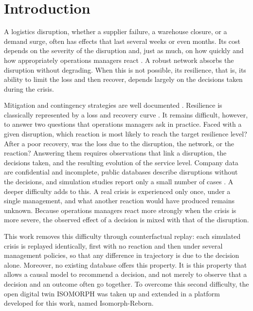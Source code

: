 \section{Introduction}
\label{sec:1}

A logistics disruption, whether a supplier failure, a warehouse closure, or a demand surge, often has effects that last several weeks or even months. Its cost depends on the severity of the disruption and, just as much, on how quickly and how appropriately operations managers react \citep{sheffi2005book,ivanov2019ijpr}. A robust network absorbs the disruption without degrading. When this is not possible, its resilience, that is, its ability to limit the loss and then recover, depends largely on the decisions taken during the crisis.

Mitigation and contingency strategies are well documented \citep{tomlin2006,chopra2004}. Resilience is classically represented by a loss and recovery curve \citep{bruneau2003,rahiel2026in4pl}. It remains difficult, however, to answer two questions that operations managers ask in practice. Faced with a given disruption, which reaction is most likely to reach the target resilience level? After a poor recovery, was the loss due to the disruption, the network, or the reaction? Answering them requires observations that link a disruption, the decisions taken, and the resulting evolution of the service level. Company data are confidential and incomplete, public databases describe disruptions without the decisions, and simulation studies report only a small number of cases \citep{ramzy2022,do2024}. A deeper difficulty adds to this. A real crisis is experienced only once, under a single management, and what another reaction would have produced remains unknown. Because operations managers react more strongly when the crisis is more severe, the observed effect of a decision is mixed with that of the disruption.

This work removes this difficulty through counterfactual replay: each simulated crisis is replayed identically, first with no reaction and then under several management policies, so that any difference in trajectory is due to the decision alone. Moreover, no existing database offers this property. It is this property that allows a causal model to recommend a decision, and not merely to observe that a decision and an outcome often go together. To overcome this second difficulty, the open digital twin ISOMORPH \citep{zhang2026isomorph} was taken up and extended in a platform developed for this work, named Isomorph-Reborn.


